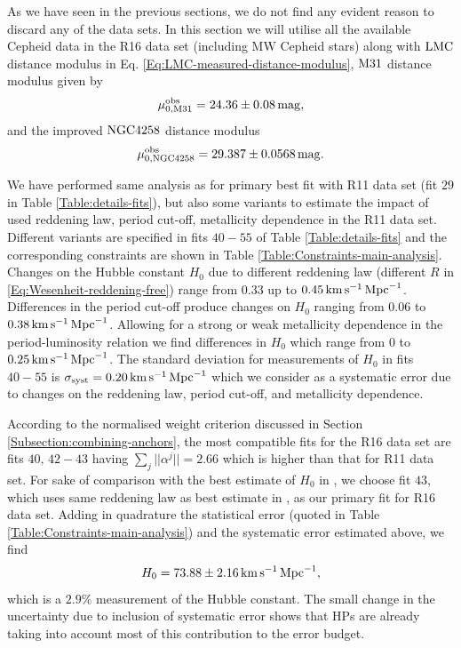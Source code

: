 As we have seen in the previous sections, we do not find any evident reason to discard any of the data sets. In this section we will utilise all the available Cepheid data in the R16 data set (including MW Cepheid stars) along with $\mathrm{LMC}$ distance modulus in Eq. \eqref{Eq:LMC-measured-distance-modulus}, $\mathrm{M31}$ distance modulus \cite{Riess:2016jrr} given by 
\begin{equation}
\mu_{0,\mathrm{M31}}^{\mathrm{obs}} = 24.36 \pm 0.08\, \mathrm{mag},
\label{Eq:M31-measured-distance-modulus-2016}
\end{equation}
and the improved $\mathrm{NGC4258}$ distance modulus \cite{Riess:2016jrr}
\begin{equation}
\mu_{0,\mathrm{NGC4258}}^{\mathrm{obs}} = 29.387 \pm 0.0568\, \mathrm{mag}.
\label{Eq:NGC4258-measured-distance-modulus-2016}
\end{equation}

We have performed same analysis as for primary best fit with R11 data set (fit $29$ in Table \ref{Table:details-fits}), but also some variants to estimate the impact of used reddening law, period cut-off, metallicity dependence in the R11 data set. Different variants are specified in fits $40-55$ of Table \ref{Table:details-fits} and the corresponding constraints are shown in Table \ref{Table:Constraints-main-analysis}. Changes on the Hubble constant $H_0$ due to different reddening law (different $R$ in \eqref{Eq:Wesenheit-reddening-free}) range from $0.33$ up to $0.45\, \mathrm{km}\, \mathrm{s}^{-1}\, \mathrm{Mpc}^{-1}$. Differences in the period cut-off produce changes on $H_0$ ranging from $0.06$ to $0.38\, \mathrm{km}\, \mathrm{s}^{-1}\, \mathrm{Mpc}^{-1}$. Allowing for a strong or weak metallicity dependence in the period-luminosity relation we find differences in $H_0$ which range from $0$ to $0.25\, \mathrm{km}\, \mathrm{s}^{-1}\, \mathrm{Mpc}^{-1}$. The standard deviation for measurements of $H_0$ in fits $40-55$ is $\sigma_{\mathrm{syst}}=0.20\, \mathrm{km}\, \mathrm{s}^{-1}\, \mathrm{Mpc}^{-1} $ which we consider as a systematic error due to changes on the reddening law, period cut-off, and metallicity dependence.

According to the normalised weight criterion discussed in Section \ref{Subsection:combining-anchors}, the most compatible fits for the R16 data set are fits $40,\, 42-43$ having $\sum_j || \alpha^{j}||=2.66$ which is higher than that for R11 data set. For sake of comparison with the best estimate of $H_0$ in \cite{Riess:2016jrr}, we choose fit $43$, which uses same reddening law as best estimate in \cite{Riess:2016jrr}, as our primary fit for R16 data set. Adding in quadrature the statistical error (quoted in Table \ref{Table:Constraints-main-analysis}) and the systematic error estimated above, we find 
\begin{equation}
H_0 = 73.88 \pm 2.16\,\mathrm{km}\, \mathrm{s}^{-1}\, \mathrm{Mpc}^{-1},
\label{Eq:primary-best-fit-R16}
\end{equation}        
which is a $2.9\%$ measurement of the Hubble constant. The small change in the uncertainty due to inclusion of systematic error shows that HPs are already taking into account most of this contribution to the error budget. 

